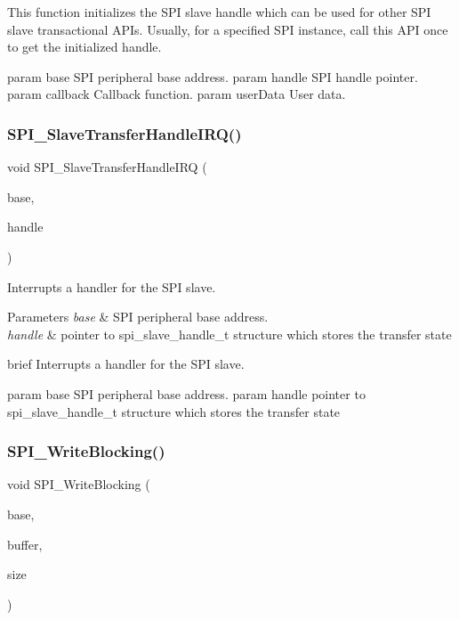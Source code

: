 This function initializes the S\+PI slave handle which can be used for other S\+PI slave transactional A\+P\+Is. Usually, for a specified S\+PI instance, call this A\+PI once to get the initialized handle.

param base S\+PI peripheral base address. param handle S\+PI handle pointer. param callback Callback function. param user\+Data User data. \mbox{\label{group__spi__driver_gaac1ff8fc728c925d78b1237949ebf7c3}} 
\subsubsection{\texorpdfstring{SPI\_SlaveTransferHandleIRQ()}{SPI\_SlaveTransferHandleIRQ()}}
{\footnotesize\ttfamily void S\+P\+I\+\_\+\+Slave\+Transfer\+Handle\+I\+RQ (\begin{DoxyParamCaption}\item[{\mbox{\hyperlink{struct_s_p_i___type}{S\+P\+I\+\_\+\+Type}} $\ast$}]{base,  }\item[{\mbox{\hyperlink{group__spi__driver_gad267cfee3a876b2860217ff94f03f574}{spi\+\_\+slave\+\_\+handle\+\_\+t}} $\ast$}]{handle }\end{DoxyParamCaption})}



Interrupts a handler for the S\+PI slave. 


\begin{DoxyParams}{Parameters}
{\em base} & S\+PI peripheral base address. \\
\hline
{\em handle} & pointer to spi\+\_\+slave\+\_\+handle\+\_\+t structure which stores the transfer state\\
\hline
\end{DoxyParams}
brief Interrupts a handler for the S\+PI slave.

param base S\+PI peripheral base address. param handle pointer to spi\+\_\+slave\+\_\+handle\+\_\+t structure which stores the transfer state \mbox{\label{group__spi__driver_gae28a41ba015e3bc92936459f83500cd0}} 
\subsubsection{\texorpdfstring{SPI\_WriteBlocking()}{SPI\_WriteBlocking()}}
{\footnotesize\ttfamily void S\+P\+I\+\_\+\+Write\+Blocking (\begin{DoxyParamCaption}\item[{\mbox{\hyperlink{struct_s_p_i___type}{S\+P\+I\+\_\+\+Type}} $\ast$}]{base,  }\item[{uint8\+\_\+t $\ast$}]{buffer,  }\item[{size\+\_\+t}]{size }\end{DoxyParamCaption})}



